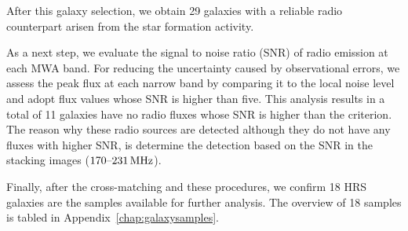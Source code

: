 After this galaxy selection, we obtain 29 galaxies with a reliable radio counterpart arisen from the star formation activity.

As a next step, we evaluate the signal to noise ratio (SNR) of radio emission at each MWA band.
For reducing the uncertainty caused by observational errors, we assess the peak flux at each narrow band by comparing it to the local noise level and adopt flux values whose SNR is higher than five.
This analysis results in a total of 11 galaxies have no radio fluxes whose SNR is higher than the criterion.
The reason why these radio sources are detected although they do not have any fluxes with higher SNR, is \citet{Hurley-Walker2017a} determine the detection based on the SNR in the stacking images ($170\mbox{--}231\,\mathrm{MHz}$).

Finally, after the cross-matching and these procedures, we confirm 18 HRS galaxies are the samples available for further analysis.
The overview of 18 samples is tabled in Appendix~\ref{chap:galaxysamples}.

%
%

